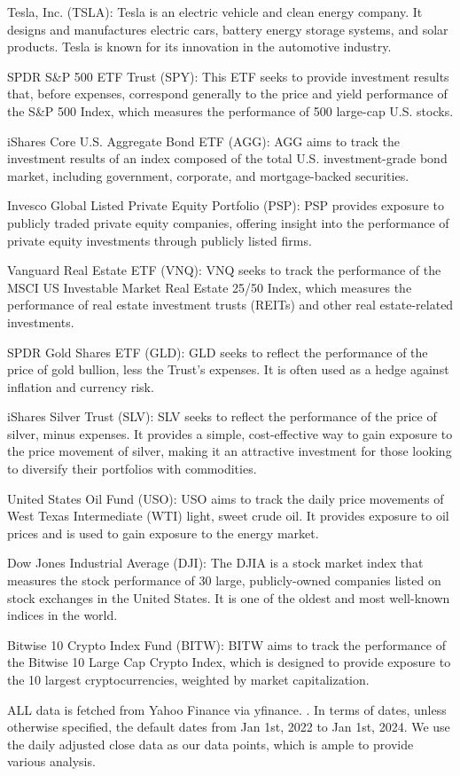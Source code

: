 Tesla, Inc. (TSLA): Tesla is an electric vehicle and clean energy company. It designs and manufactures electric cars, battery energy storage systems, and solar products. Tesla is known for its innovation in the automotive industry.

SPDR S\&P 500 ETF Trust (SPY): This ETF seeks to provide investment results that, before expenses, correspond generally to the price and yield performance of the S\&P 500 Index, which measures the performance of 500 large-cap U.S. stocks.

iShares Core U.S. Aggregate Bond ETF (AGG): AGG aims to track the investment results of an index composed of the total U.S. investment-grade bond market, including government, corporate, and mortgage-backed securities.

Invesco Global Listed Private Equity Portfolio (PSP): PSP provides exposure to publicly traded private equity companies, offering insight into the performance of private equity investments through publicly listed firms.

Vanguard Real Estate ETF (VNQ): VNQ seeks to track the performance of the MSCI US Investable Market Real Estate 25/50 Index, which measures the performance of real estate investment trusts (REITs) and other real estate-related investments.

SPDR Gold Shares ETF (GLD): GLD seeks to reflect the performance of the price of gold bullion, less the Trust’s expenses. It is often used as a hedge against inflation and currency risk.

iShares Silver Trust (SLV): SLV seeks to reflect the performance of the price of silver, minus expenses. It provides a simple, cost-effective way to gain exposure to the price movement of silver, making it an attractive investment for those looking to diversify their portfolios with commodities.

United States Oil Fund (USO): USO aims to track the daily price movements of West Texas Intermediate (WTI) light, sweet crude oil. It provides exposure to oil prices and is used to gain exposure to the energy market.

Dow Jones Industrial Average (DJI): The DJIA is a stock market index that measures the stock performance of 30 large, publicly-owned companies listed on stock exchanges in the United States. It is one of the oldest and most well-known indices in the world.

Bitwise 10 Crypto Index Fund (BITW): BITW aims to track the performance of the Bitwise 10 Large Cap Crypto Index, which is designed to provide exposure to the 10 largest cryptocurrencies, weighted by market capitalization.

ALL data is fetched from Yahoo Finance via yfinance. \cite{yfinance}. In terms of dates, unless otherwise specified, the default dates from Jan 1st, 2022 to Jan 1st, 2024. We use the daily adjusted close data as our data points, which is ample to provide various analysis.
